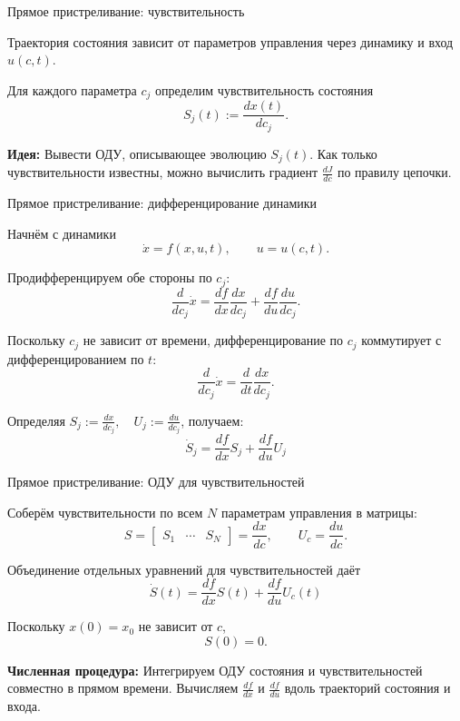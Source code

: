 \documentclass{beamer}
\begin{document}
	
	\begin{frame}{Прямое пристреливание: чувствительность}
		\begin{flushleft}
			Траектория состояния зависит от параметров управления
			через динамику и вход $u(c,t)$.
			
			Для каждого параметра $c_j$ определим чувствительность состояния
			\[
			S_j(t) := \frac{dx(t)}{dc_j}.
			\]
			
			\bigskip
			
			\textbf{Идея:} Вывести ОДУ, описывающее эволюцию
			$S_j(t)$. Как только чувствительности известны, можно вычислить
			градиент $\frac{dJ}{dc}$ по правилу цепочки.
		\end{flushleft}
	\end{frame}
	
	\begin{frame}{Прямое пристреливание: дифференцирование динамики}
		\begin{flushleft}
			Начнём с динамики
			\[
			\dot{x} = f(x,u,t),
			\qquad u=u(c,t).
			\]
			
			Продифференцируем обе стороны по $c_j$:
			\[
			\frac{d}{dc_j}\dot{x}
			=
			\frac{df}{dx}\frac{dx}{dc_j}
			+
			\frac{df}{du}\frac{du}{dc_j}.
			\]
			
			Поскольку $c_j$ не зависит от времени, дифференцирование
			по $c_j$ коммутирует с дифференцированием
			по $t$:
			\[
			\frac{d}{dc_j}\dot{x}
			=
			\frac{d}{dt}\frac{dx}{dc_j}.
			\]
			
			Определяя $S_j := \frac{dx}{dc_j},
			\quad
			U_j := \frac{du}{dc_j}$, 
			получаем:
			\[
			\boxed{
				\dot{S}_j
				=
				\frac{df}{dx}S_j
				+
				\frac{df}{du}U_j
			}
			\]
		\end{flushleft}
	\end{frame}
	
	\begin{frame}{Прямое пристреливание: ОДУ для чувствительностей}
		\begin{flushleft}
			Соберём чувствительности по всем $N$
			параметрам управления в матрицы:
			\[
			S =
			\begin{bmatrix}
				S_1 & \cdots & S_N
			\end{bmatrix}
			=
			\frac{dx}{dc},
			\qquad
			U_c = \frac{du}{dc}.
			\]
			
			Объединение отдельных уравнений для чувствительностей даёт
			\[
			\boxed{
				\dot{S}(t)
				=
				\frac{df}{dx}S(t)
				+
				\frac{df}{du}U_c(t)
			}
			\]
			
			\bigskip
			
			Поскольку $x(0)=x_0$ не зависит от $c$,
			\[
			\boxed{S(0)=0.}
			\]
			
			\textbf{Численная процедура:} Интегрируем ОДУ состояния и
			чувствительностей совместно в прямом времени. Вычисляем $\frac{df}{dx}$
			и $\frac{df}{du}$ вдоль траекторий состояния и входа.
		\end{flushleft}
	\end{frame}
	
\end{document}
